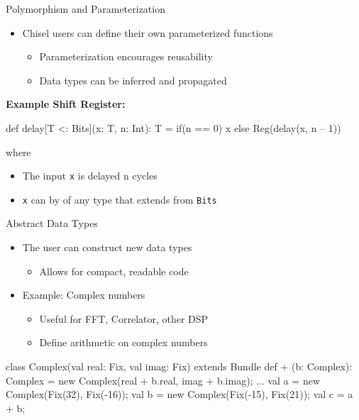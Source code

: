 \documentclass[xcolor=pdflatex,dvipsnames,table]{beamer}
\begin{document}
\begin{frame}[fragile]{Polymorphism and Parameterization}
\begin{itemize}
\item Chisel users can define their own parameterized functions
\begin{itemize}
\item Parameterization encourages reusability
\item Data types can be inferred and propagated
\end{itemize}
\end{itemize}

\textbf{Example Shift Register:}
\begin{scala}
def delay[T <: Bits](x: T, n: Int): T = 
  if(n == 0) x else Reg(delay(x, n – 1))
\end{scala}
where
\begin{itemize}
\item The input \verb+x+ is delayed n cycles
\item \verb+x+ can by of any type that extends from \verb+Bits+
\end{itemize}

\end{frame}

\begin{frame}[fragile]{Abstract Data Types}
\begin{itemize}
\item The user can construct new data types
\begin{itemize}
\item Allows for compact, readable code
\end{itemize}
\item Example: Complex numbers
\begin{itemize}
\item Useful for FFT, Correlator, other DSP
\item Define arithmetic on complex numbers
\end{itemize}
\end{itemize}

\begin{footnotesize}
\begin{scala}
class Complex(val real: Fix, val imag: Fix) 
    extends Bundle {
  def + (b: Complex): Complex = 
    new Complex(real + b.real, imag + b.imag);
  ...
}
val a = new Complex(Fix(32), Fix(-16));
val b = new Complex(Fix(-15), Fix(21));
val c = a + b;
\end{scala}
\end{footnotesize}

\end{frame}
\end{document}
